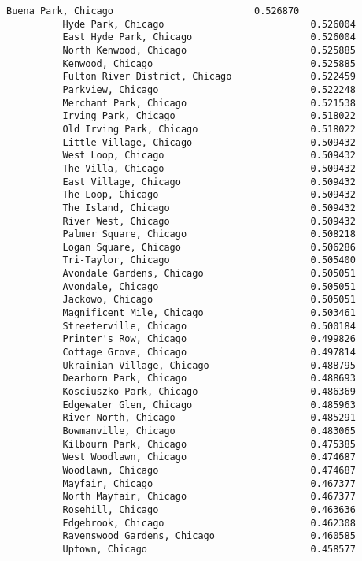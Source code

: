 \documentclass[11pt]{article}
\begin{document}
\begin{Verbatim}[commandchars=\\\{\}]
          Buena Park, Chicago                         0.526870
          Hyde Park, Chicago                          0.526004
          East Hyde Park, Chicago                     0.526004
          North Kenwood, Chicago                      0.525885
          Kenwood, Chicago                            0.525885
          Fulton River District, Chicago              0.522459
          Parkview, Chicago                           0.522248
          Merchant Park, Chicago                      0.521538
          Irving Park, Chicago                        0.518022
          Old Irving Park, Chicago                    0.518022
          Little Village, Chicago                     0.509432
          West Loop, Chicago                          0.509432
          The Villa, Chicago                          0.509432
          East Village, Chicago                       0.509432
          The Loop, Chicago                           0.509432
          The Island, Chicago                         0.509432
          River West, Chicago                         0.509432
          Palmer Square, Chicago                      0.508218
          Logan Square, Chicago                       0.506286
          Tri-Taylor, Chicago                         0.505400
          Avondale Gardens, Chicago                   0.505051
          Avondale, Chicago                           0.505051
          Jackowo, Chicago                            0.505051
          Magnificent Mile, Chicago                   0.503461
          Streeterville, Chicago                      0.500184
          Printer's Row, Chicago                      0.499826
          Cottage Grove, Chicago                      0.497814
          Ukrainian Village, Chicago                  0.488795
          Dearborn Park, Chicago                      0.488693
          Kosciuszko Park, Chicago                    0.486369
          Edgewater Glen, Chicago                     0.485963
          River North, Chicago                        0.485291
          Bowmanville, Chicago                        0.483065
          Kilbourn Park, Chicago                      0.475385
          West Woodlawn, Chicago                      0.474687
          Woodlawn, Chicago                           0.474687
          Mayfair, Chicago                            0.467377
          North Mayfair, Chicago                      0.467377
          Rosehill, Chicago                           0.463636
          Edgebrook, Chicago                          0.462308
          Ravenswood Gardens, Chicago                 0.460585
          Uptown, Chicago                             0.458577

\end{Verbatim}
\end{document}

